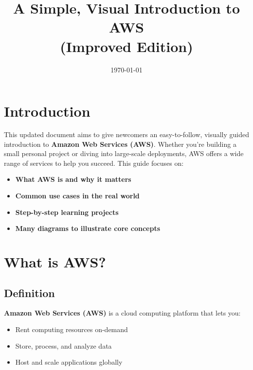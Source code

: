 \documentclass[11pt]{article}
\title{\textbf{A Simple, Visual Introduction to AWS}\\ \large (Improved Edition)}
\author{}
\date{\today}
\begin{document}
\maketitle

\tableofcontents
\vspace{1cm}

\section*{Introduction}

This updated document aims to give newcomers an easy-to-follow, visually guided introduction to \textbf{Amazon Web Services (AWS)}. Whether you're building a small personal project or diving into large-scale deployments, AWS offers a wide range of services to help you succeed. This guide focuses on:

\begin{itemize}
    \item \textbf{What AWS is and why it matters}
    \item \textbf{Common use cases in the real world}
    \item \textbf{Step-by-step learning projects}
    \item \textbf{Many diagrams to illustrate core concepts}
\end{itemize}

\clearpage

\section{What is AWS?}

\subsection{Definition}
\textbf{Amazon Web Services (AWS)} is a cloud computing platform that lets you:

\begin{itemize}
    \item Rent computing resources on-demand
    \item Store, process, and analyze data
    \item Host and scale applications globally
\end{itemize}
\end{document}

